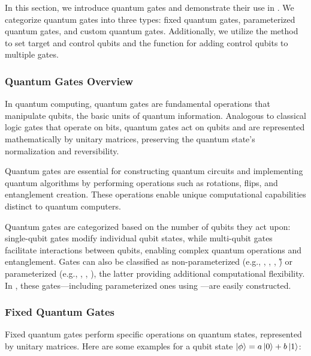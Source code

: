 In this section, we introduce quantum gates and demonstrate their use in \MindQuantum. We categorize quantum gates into three types: fixed quantum gates, parameterized quantum gates, and custom quantum gates. Additionally, we utilize the  method to set target and control qubits and the  function for adding control qubits to multiple gates.

\subsubsection{Quantum Gates Overview}

In quantum computing, quantum gates are fundamental operations that manipulate qubits, the basic units of quantum information. Analogous to classical logic gates that operate on bits, quantum gates act on qubits and are represented mathematically by unitary matrices, preserving the quantum state's normalization and reversibility.

Quantum gates are essential for constructing quantum circuits and implementing quantum algorithms by performing operations such as rotations, flips, and entanglement creation. These operations enable unique computational capabilities distinct to quantum computers.

Quantum gates are categorized based on the number of qubits they act upon: single-qubit gates modify individual qubit states, while multi-qubit gates facilitate interactions between qubits, enabling complex quantum operations and entanglement. Gates can also be classified as non-parameterized (e.g., \X, \Y, \Z, \H) or parameterized (e.g., \RX, \RY, \RZ), the latter providing additional computational flexibility. In \MindQuantum, these gates---including parameterized ones using \ParameterResolver---are easily constructed.

\subsubsection{Fixed Quantum Gates}
Fixed quantum gates perform specific operations on quantum states, represented by unitary matrices. Here are some examples for a qubit state $\ket{\phi}=a\ket{0}+b\ket{1}$:

